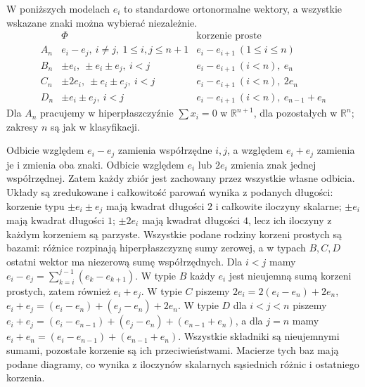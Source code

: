 \begin{przyklad}
\label{aa:prz:classical-roots}
W poniższych modelach $e_i$ to standardowe
ortonormalne wektory, a wszystkie wskazane
znaki można wybierać niezależnie.
\[
\begin{array}{c|l|l}
 &\Phi&\text{korzenie proste}\\ \hline
 A_n & e_i-e_j,\ i\ne j,\ 1\le i,j\le n+1
       & e_i-e_{i+1}\ (1\le i\le n)\\
 B_n & \pm e_i,\ \pm e_i\pm e_j,\ i<j
       & e_i-e_{i+1}\ (i<n),\ e_n\\
 C_n & \pm2e_i,\ \pm e_i\pm e_j,\ i<j
       & e_i-e_{i+1}\ (i<n),\ 2e_n\\
 D_n & \pm e_i\pm e_j,\ i<j
       & e_i-e_{i+1}\ (i<n),\ e_{n-1}+e_n
\end{array}
\]
Dla $A_n$ pracujemy w hiperpłaszczyźnie
$\sum x_i=0$ w $\mathbb R^{n+1}$, dla pozostałych
w $\mathbb R^n$; zakresy $n$ są jak w klasyfikacji.

Odbicie względem $e_i-e_j$ zamienia współrzędne
$i,j$, a względem $e_i+e_j$ zamienia je i zmienia
oba znaki. Odbicie względem $e_i$ lub $2e_i$ zmienia
znak jednej współrzędnej. Zatem każdy zbiór jest
zachowany przez wszystkie własne odbicia.
Układy są zredukowane i całkowitość parowań wynika
z podanych długości: korzenie typu $\pm e_i\pm e_j$
mają kwadrat długości $2$ i całkowite iloczyny
skalarne; $\pm e_i$ mają kwadrat długości $1$;
$\pm2e_i$ mają kwadrat długości $4$, lecz ich
iloczyny z każdym korzeniem są parzyste.
Wszystkie podane rodziny korzeni prostych są bazami:
różnice rozpinają hiperpłaszczyznę sumy zerowej,
a w typach $B,C,D$ ostatni wektor ma niezerową
sumę współrzędnych. Dla $i<j$ mamy
$e_i-e_j=\sum_{k=i}^{j-1}(e_k-e_{k+1})$.
W typie $B$ każdy $e_i$ jest nieujemną sumą
korzeni prostych, zatem również $e_i+e_j$.
W typie $C$ piszemy $2e_i=2(e_i-e_n)+2e_n$,
$e_i+e_j=(e_i-e_n)+(e_j-e_n)+2e_n$.
W typie $D$ dla $i<j<n$ piszemy
$e_i+e_j=(e_i-e_{n-1})+(e_j-e_n)+(e_{n-1}+e_n)$,
a dla $j=n$ mamy
$e_i+e_n=(e_i-e_{n-1})+(e_{n-1}+e_n)$.
Wszystkie składniki są nieujemnymi sumami,
pozostałe korzenie są ich przeciwieństwami.
Macierze tych baz mają podane diagramy,
co wynika z iloczynów skalarnych sąsiednich różnic
i ostatniego korzenia.
\end{przyklad}

